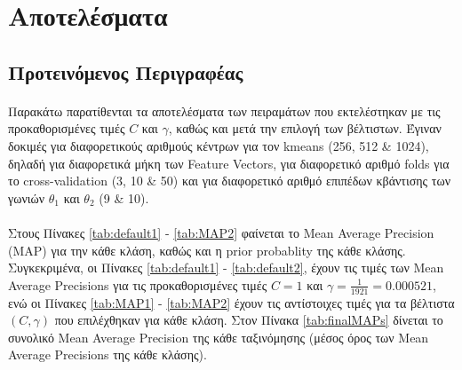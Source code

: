 \section{Αποτελέσματα}
\subsection{Προτεινόμενος Περιγραφέας}
\paragraph*{}
Παρακάτω παρατίθενται τα αποτελέσματα των πειραμάτων που εκτελέστηκαν με τις προκαθορισμένες τιμές $C$ και $\gamma$, καθώς και μετά την επιλογή των βέλτιστων. Έγιναν δοκιμές για διαφορετικούς αριθμούς κέντρων για τον kmeans (256, 512 \& 1024), δηλαδή για διαφορετικά μήκη των Feature Vectors, για διαφορετικό αριθμό folds για το cross-validation (3, 10 \& 50) και για διαφορετικό αριθμό επιπέδων κβάντισης των γωνιών $\theta_1$ και $\theta_2$ (9 \& 10).

\paragraph*{}
Στους Πίνακες \ref{tab:default1} - \ref{tab:MAP2} φαίνεται το Mean Average Precision (MAP) για την κάθε κλάση, καθώς και η prior probablity της κάθε κλάσης. Συγκεκριμένα, οι Πίνακες \ref{tab:default1} - \ref{tab:default2}, έχουν τις τιμές των Mean Average Precisions για τις προκαθορισμένες τιμές $C = 1$ και $\gamma = \frac{1}{1921} = 0.000521$, ενώ οι Πίνακες \ref{tab:MAP1} - \ref{tab:MAP2} έχουν τις αντίστοιχες τιμές για τα βέλτιστα $(C, \gamma)$ που επιλέχθηκαν για κάθε κλάση. Στον Πίνακα \ref{tab:finalMAPs} δίνεται το συνολικό Mean Average Precision της κάθε ταξινόμησης (μέσος όρος των Mean Average Precisions της κάθε κλάσης).


